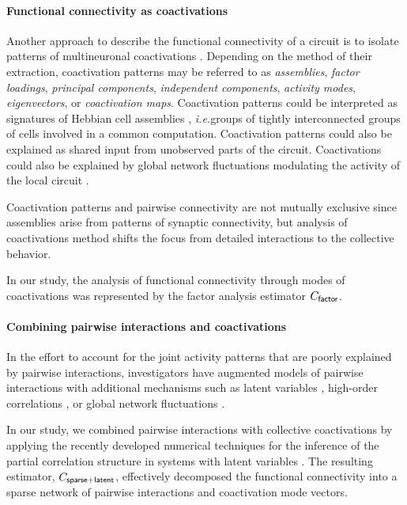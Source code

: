 \documentclass[10pt]{article}
\newcommand{\ie}{\emph{i.e.}\;}
\begin{document}
\paragraph{Functional connectivity as coactivations}
Another approach to describe the functional connectivity of a circuit is to isolate patterns of multineuronal coactivations \cite{Gerstein:1989, Chapin:1999, Peyrache:2010, Ch:2010, Lopes:2011, Lopes:2013}. Depending on the method of their extraction, coactivation patterns may be referred to as \emph{assemblies}, \emph{factor loadings}, \emph{principal components}, \emph{independent components}, \emph{activity modes}, \emph{eigenvectors}, or \emph{coactivation maps}. Coactivation patterns could be interpreted as signatures of Hebbian cell assemblies \cite{Gerstein:1989, Ch:2010}, \ie groups of tightly interconnected groups of cells involved in a common computation.  Coactivation patterns could also be explained as shared input from unobserved parts of the circuit.  Coactivations could also be explained by global network fluctuations modulating the activity of the local circuit \cite{Okun:2012}.

Coactivation patterns and pairwise connectivity are not mutually exclusive since assemblies arise from patterns of synaptic connectivity, but analysis of coactivations method shifts the focus from detailed interactions to the collective behavior.  

In our study, the analysis of functional connectivity through modes of coactivations was represented by the factor analysis estimator $C_{\sf factor}$.  

\paragraph{Combining pairwise interactions and coactivations}
In the effort to account for the joint activity patterns that are poorly explained by pairwise interactions, investigators have augmented models of pairwise interactions with additional mechanisms such as latent variables \cite{Koster:2013},  high-order correlations \cite{Ganmor:2011}, or global network fluctuations \cite{Tkacik:2013}.

In our study, we combined pairwise interactions with collective coactivations by applying the recently developed numerical techniques for the inference of the partial correlation structure in systems with latent variables \cite{Chandrasekaran:2010, Ma:2013}.  The resulting estimator, $C_{\sf sparse+latent}$, effectively decomposed the functional connectivity into a sparse network of pairwise interactions and coactivation mode vectors.
\end{document}
